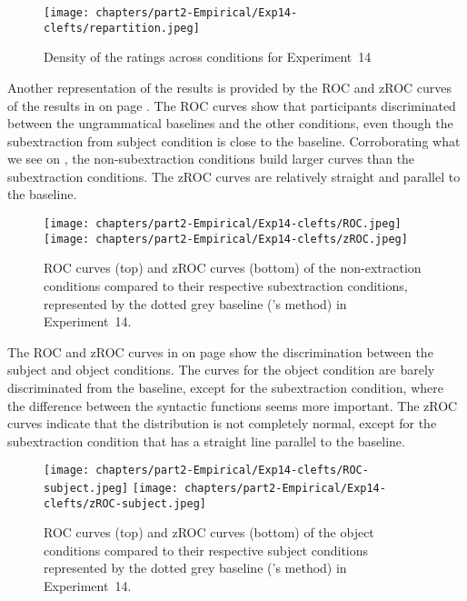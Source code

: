 \begin{figure}
    \centering
    \texttt{[image: chapters/part2-Empirical/Exp14-clefts/repartition.jpeg]}
    \caption{Density of the ratings across conditions for Experiment~14}
    \label{fig:exp14-repartition}
\end{figure}

Another representation of the results is provided by the ROC and zROC curves of the results in  on page \pageref{fig:exp14-ROC}. The ROC curves show that participants discriminated between the ungrammatical baselines and the other conditions, even though the subextraction from subject condition is close to the baseline. Corroborating what we see on , the non-subextraction conditions build larger curves than the subextraction conditions. The zROC curves are relatively straight and parallel to the baseline. 

\begin{figure}
    \centering
    \texttt{[image: chapters/part2-Empirical/Exp14-clefts/ROC.jpeg]}
    \texttt{[image: chapters/part2-Empirical/Exp14-clefts/zROC.jpeg]}
    \caption{ROC curves (top) and zROC curves (bottom) of the non-extraction conditions compared to their respective subextraction conditions, represented by the dotted grey baseline (\citealt{Dillon.2019}'s method) in Experiment~14.}
    \label{fig:exp14-ROC}
\end{figure}

The ROC and zROC curves in  on page \pageref{fig:exp14-ROC-subj} show the discrimination between the subject and object conditions. The curves for the object condition are barely discriminated from the baseline, except for the subextraction condition, where the difference between the syntactic functions seems more important. The zROC curves indicate that the distribution is not completely normal, except for the subextraction condition that has a straight line parallel to the baseline.

\begin{figure}
    \centering
    \texttt{[image: chapters/part2-Empirical/Exp14-clefts/ROC-subject.jpeg]}
    \texttt{[image: chapters/part2-Empirical/Exp14-clefts/zROC-subject.jpeg]}
    \caption{ROC curves (top) and zROC curves (bottom) of the object conditions compared to their respective subject conditions represented by the dotted grey baseline (\citealt{Dillon.2019}'s method) in Experiment~14.}
    \label{fig:exp14-ROC-subj}
\end{figure}

